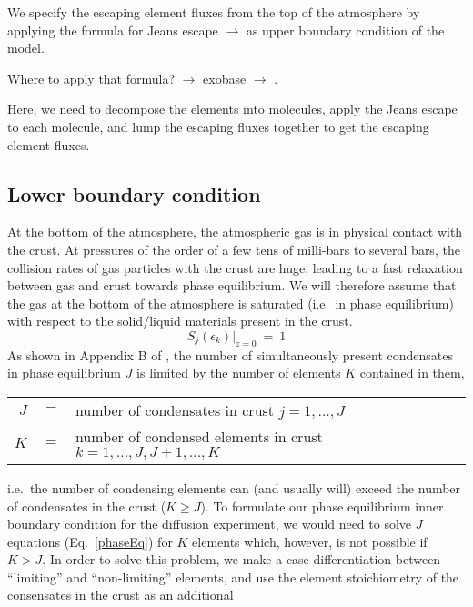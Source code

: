 \documentclass[11pt]{article}
\def\ek{\epsilon_k}
\begin{document}
We specify the escaping element fluxes from the top of the atmosphere 
by applying the formula for Jeans escape $\to$ \citet{Tian2015} as
upper boundary condition of the model.

\noindent Where to apply that formula? $\to$ exobase $\to$ \citet{Volkov2011}.

\noindent Here, we need to decompose the elements into molecules,
apply the Jeans escape to each molecule, and lump the escaping fluxes
together to get the escaping element fluxes. 

\subsection{Lower boundary condition}
\label{LowerBound}

At the bottom of the atmosphere, the atmospheric gas is in physical
contact with the crust. At pressures of the order of a few tens of
milli-bars to several bars, the collision rates of gas particles with
the crust are huge, leading to a fast relaxation between gas and crust
towards phase equilibrium.  We will therefore assume that the gas at
the bottom of the atmosphere is saturated (i.e.\ in phase equilibrium)
with respect to the solid/liquid materials present in the crust.
\begin{equation}
  S_j(\ek)\Big|_{z=0} ~=~ 1
  \label{phaseEq}
\end{equation}
As shown in Appendix B of \citep{Woitke2017}, the number of
simultaneously present condensates in phase equilibrium $J$ is limited
by the number of elements $K$ contained in them,
\smallskip
\begin{center}
\begin{tabular}{rcl}
  $J$ &$=$& number of condensates in crust $j=1,...,J$\\
  $K$ &$=$& number of condensed elements in crust $k=1,...,J,J+1,...,K$ \\
\end{tabular}
\end{center} 
i.e.\ the number of condensing elements can (and usually will) exceed
the number of condensates in the crust ($K\geq J$). To formulate our
phase equilibrium inner boundary condition for the diffusion
experiment, we would need to solve $J$ equations (Eq.~\ref{phaseEq})
for $K$ elements which, however, is not possible if $K>J$. In order to
solve this problem, we make a case differentiation between
``limiting'' and ``non-limiting'' elements, and use the element
stoichiometry of the consensates in the crust as an additional
\end{document}
